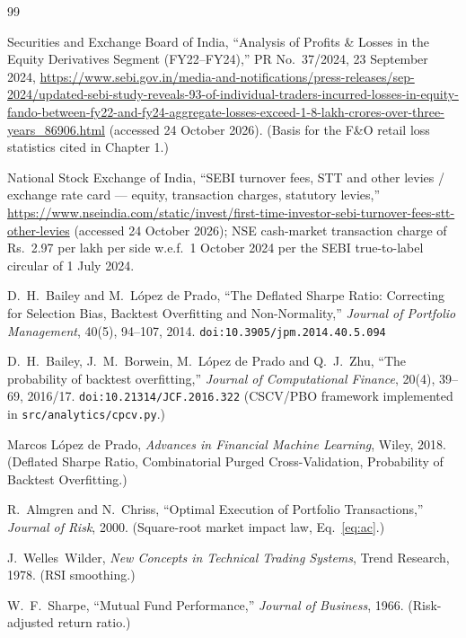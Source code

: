 \documentclass[12pt,a4paper,oneside]{report}
\newcommand{\rupee}{Rs.\ }
\newcommand{\doi}[1]{\texttt{doi:#1}}
\begin{document}
\begin{thebibliography}{99}

 Securities and Exchange Board of India, ``Analysis of
Profits \& Losses in the Equity Derivatives Segment (FY22--FY24),'' PR
No.~37/2024, 23 September 2024,
\url{https://www.sebi.gov.in/media-and-notifications/press-releases/sep-2024/updated-sebi-study-reveals-93-of-individual-traders-incurred-losses-in-equity-fando-between-fy22-and-fy24-aggregate-losses-exceed-1-8-lakh-crores-over-three-years_86906.html}
(accessed 24 October 2026). (Basis for the F\&O retail loss statistics cited in
Chapter 1.)

 National Stock Exchange of India, ``SEBI turnover fees, STT and
other levies / exchange rate card --- equity, transaction charges, statutory
levies,'' \url{https://www.nseindia.com/static/invest/first-time-investor-sebi-turnover-fees-stt-other-levies}
(accessed 24 October 2026); NSE cash-market transaction charge of
\rupee{}2.97 per lakh per side w.e.f.\ 1 October 2024 per the SEBI
true-to-label circular of 1 July 2024.

 D.~H.~Bailey and M.~L\'opez de Prado, ``The Deflated
Sharpe Ratio: Correcting for Selection Bias, Backtest Overfitting and
Non-Normality,'' \textit{Journal of Portfolio Management}, 40(5), 94--107,
2014. \doi{10.3905/jpm.2014.40.5.094}

 D.~H.~Bailey, J.~M.~Borwein, M.~L\'opez de Prado and
Q.~J.~Zhu, ``The probability of backtest overfitting,'' \textit{Journal of
Computational Finance}, 20(4), 39--69, 2016/17. \doi{10.21314/JCF.2016.322}
(CSCV/PBO framework implemented in \texttt{src/analytics/cpcv.py}.)

 Marcos L\'opez de Prado, \textit{Advances in Financial Machine
Learning}, Wiley, 2018. (Deflated Sharpe Ratio, Combinatorial Purged
Cross-Validation, Probability of Backtest Overfitting.)

 R.~Almgren and N.~Chriss, ``Optimal Execution of Portfolio
Transactions,'' \textit{Journal of Risk}, 2000. (Square-root market impact
law, Eq.~\ref{eq:ac}.)

 J.~Welles~Wilder, \textit{New Concepts in Technical Trading
Systems}, Trend Research, 1978. (RSI smoothing.)

 W.~F.~Sharpe, ``Mutual Fund Performance,'' \textit{Journal of
Business}, 1966. (Risk-adjusted return ratio.)


\end{thebibliography}
\end{document}
